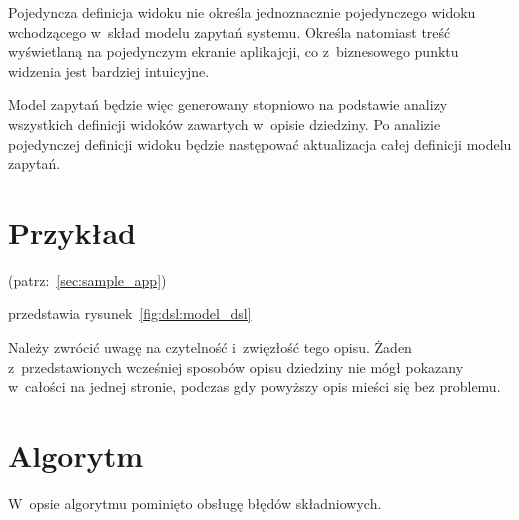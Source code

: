 Pojedyncza definicja widoku nie określa jednoznacznie pojedynczego widoku wchodzącego w~skład modelu zapytań systemu.
Określa natomiast treść wyświetlaną na pojedynczym ekranie aplikajcji, co z~biznesowego punktu widzenia jest bardziej intuicyjne.

Model zapytań będzie więc generowany stopniowo na podstawie analizy wszystkich definicji widoków zawartych w~opisie dziedziny.
Po analizie pojedynczej definicji widoku będzie następować aktualizacja całej definicji modelu zapytań.



\section{Przykład}

(patrz:~\ref{sec:sample_app})

przedstawia rysunek~\ref{fig:dsl:model_dsl}


Należy zwrócić uwagę na czytelność i~zwięzłość tego opisu.
Żaden z~przedstawionych wcześniej sposobów opisu dziedziny nie mógł pokazany w~całości na jednej stronie, podczas gdy powyższy opis mieści się bez problemu.



\section{Algorytm}

W~opsie algorytmu pominięto obsługę błędów składniowych.

